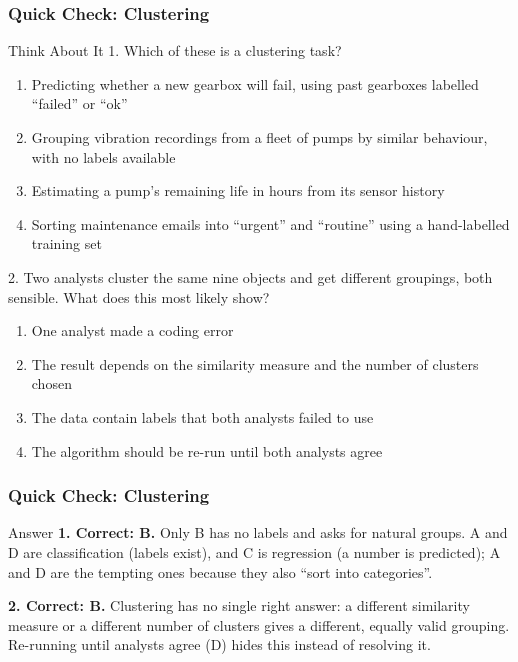 \begin{frame}[fragile]\frametitle{Quick Check: Clustering}
\begin{block}{Think About It}
1. Which of these is a clustering task?
\begin{enumerate}
  \item[A.] Predicting whether a new gearbox will fail, using past gearboxes labelled ``failed'' or ``ok''
  \item[B.] Grouping vibration recordings from a fleet of pumps by similar behaviour, with no labels available
  \item[C.] Estimating a pump's remaining life in hours from its sensor history
  \item[D.] Sorting maintenance emails into ``urgent'' and ``routine'' using a hand-labelled training set
\end{enumerate}
2. Two analysts cluster the same nine objects and get different groupings, both sensible. What does this most likely show?
\begin{enumerate}
  \item[A.] One analyst made a coding error
  \item[B.] The result depends on the similarity measure and the number of clusters chosen
  \item[C.] The data contain labels that both analysts failed to use
  \item[D.] The algorithm should be re-run until both analysts agree
\end{enumerate}
\end{block}
\end{frame}

\begin{frame}[fragile]\frametitle{Quick Check: Clustering}
\begin{block}{Answer}
\textbf{1. Correct: B.} Only B has no labels and asks for natural groups. A and D are classification (labels exist), and C is regression (a number is predicted); A and D are the tempting ones because they also ``sort into categories''.

\textbf{2. Correct: B.} Clustering has no single right answer: a different similarity measure or a different number of clusters gives a different, equally valid grouping. Re-running until analysts agree (D) hides this instead of resolving it.
\end{block}
\end{frame}

